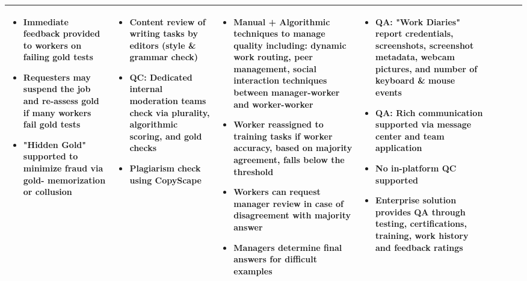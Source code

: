 \documentclass{sigchi}
\begin{document}
\begin{sidewaystable*}
\begin{tabular}[h]{| p{1.5cm}| p{2.7cm}| p{2.7cm}| p{2.7cm}| p{2.7cm}| p{2.7cm}| p{2.7cm}| p{2.7cm}|}
{\begin{itemize} [noitemsep,nolistsep]
\item  Immediate feedback provided to workers on failing gold tests
\item  Requesters may suspend the job and re-assess gold if many workers fail gold tests
\item  "Hidden Gold" supported to minimize fraud via gold- memorization or collusion
\end{itemize}
} &
{
\begin{itemize} [noitemsep,nolistsep]
\item  Content review of writing tasks by editors (style \& grammar check)
\item  QC: Dedicated internal moderation teams check via plurality, algorithmic scoring, and gold checks
\item  Plagiarism check using CopyScape
\end{itemize}
} &
{
\begin{itemize} [noitemsep,nolistsep]
\item  Manual + Algorithmic techniques to manage quality including: dynamic work routing, peer management, social interaction techniques between manager-worker and worker-worker
\item  Worker reassigned to training tasks if worker accuracy, based on majority agreement, falls below the threshold
\item  Workers can request manager review in case of disagreement with majority answer
\item  Managers determine final answers for difficult examples
\end{itemize}
} &
{
\begin{itemize} [noitemsep,nolistsep]
\item  QA: "Work Diaries" report credentials, screenshots, screenshot metadata, webcam pictures, and number of keyboard \& mouse events
\item  QA: Rich communication supported via message center and team application
\item  No in-platform QC supported
\item  Enterprise solution provides QA through testing, certifications, training, work history and feedback ratings
\end{itemize}
} \\ 
\hline




\end{tabular}
\end{sidewaystable*}
\end{document}
